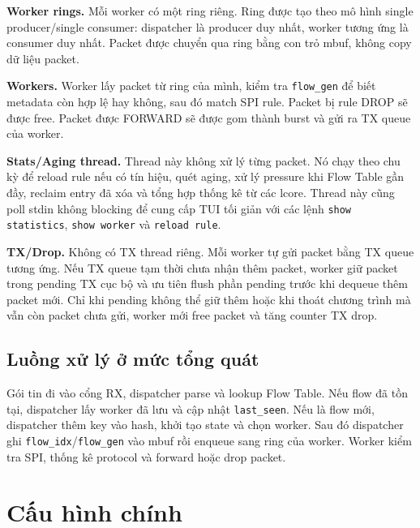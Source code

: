\documentclass[12pt,a4paper]{report}
\DeclareRobustCommand{\code}[1]{{\small\texttt{#1}}}
\begin{document}
\textbf{Worker rings.} Mỗi worker có một ring riêng. Ring được tạo theo mô hình single producer/single consumer: dispatcher là producer duy nhất, worker tương ứng là consumer duy nhất. Packet được chuyển qua ring bằng con trỏ mbuf, không copy dữ liệu packet.

\textbf{Workers.} Worker lấy packet từ ring của mình, kiểm tra \code{flow\_gen} để biết metadata còn hợp lệ hay không, sau đó match SPI rule. Packet bị rule DROP sẽ được free. Packet được FORWARD sẽ được gom thành burst và gửi ra TX queue của worker.

\textbf{Stats/Aging thread.} Thread này không xử lý từng packet. Nó chạy theo chu kỳ để reload rule nếu có tín hiệu, quét aging, xử lý pressure khi Flow Table gần đầy, reclaim entry đã xóa và tổng hợp thống kê từ các lcore. Thread này cũng poll stdin không blocking để cung cấp TUI tối giản với các lệnh \code{show statistics}, \code{show worker} và \code{reload rule}.

\textbf{TX/Drop.} Không có TX thread riêng. Mỗi worker tự gửi packet bằng TX queue tương ứng. Nếu TX queue tạm thời chưa nhận thêm packet, worker giữ packet trong pending TX cục bộ và ưu tiên flush phần pending trước khi dequeue thêm packet mới. Chỉ khi pending không thể giữ thêm hoặc khi thoát chương trình mà vẫn còn packet chưa gửi, worker mới free packet và tăng counter TX drop.

\subsection{Luồng xử lý ở mức tổng quát}

Gói tin đi vào cổng RX, dispatcher parse và lookup Flow Table. Nếu flow đã tồn tại, dispatcher lấy worker đã lưu và cập nhật \code{last\_seen}. Nếu là flow mới, dispatcher thêm key vào hash, khởi tạo state và chọn worker. Sau đó dispatcher ghi \code{flow\_idx}/\code{flow\_gen} vào mbuf rồi enqueue sang ring của worker. Worker kiểm tra SPI, thống kê protocol và forward hoặc drop packet.

\section{Cấu hình chính}
\end{document}
